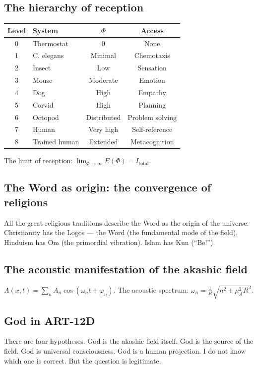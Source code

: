 \documentclass[11pt,a4paper]{article}
\begin{document}
\subsection{The hierarchy of reception}
\begin{table}[H]
\centering
\begin{tabular}{@{}clcc@{}}
\toprule
\textbf{Level} & \textbf{System} & \textbf{$\Phi$} & \textbf{Access} \\ \midrule
0 & Thermostat & 0 & None \\
1 & C. elegans & Minimal & Chemotaxis \\
2 & Insect & Low & Sensation \\
3 & Mouse & Moderate & Emotion \\
4 & Dog & High & Empathy \\
5 & Corvid & High & Planning \\
6 & Octopod & Distributed & Problem solving \\
7 & Human & Very high & Self-reference \\
8 & Trained human & Extended & Metacognition \\ \bottomrule
\end{tabular}
\end{table}
The limit of reception: $\lim_{\Phi \rightarrow \infty} E(\Phi) = I_{\text{total}}$.

\subsection{The Word as origin: the convergence of religions}
All the great religious traditions describe the Word as the origin of the universe. Christianity has the Logos --- the Word (the fundamental mode of the field). Hinduism has Om (the primordial vibration). Islam has Kun (``Be!'').

\subsection{The acoustic manifestation of the akashic field}
$A(x,t) = \sum_n A_n \cos(\omega_n t + \varphi_n)$. The acoustic spectrum: $\omega_n = \frac{1}{R} \sqrt{n^2 + \mu_A^2 R^2}$.

\subsection{God in ART-12D}
There are four hypotheses. God is the akashic field itself. God is the source of the field. God is universal consciousness. God is a human projection. I do not know which one is correct. But the question is legitimate.
\end{document}
